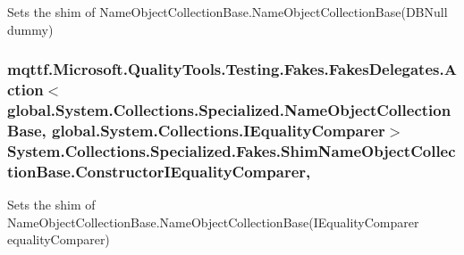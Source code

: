 Sets the shim of Name\-Object\-Collection\-Base.\-Name\-Object\-Collection\-Base(\-D\-B\-Null dummy)

\hypertarget{class_system_1_1_collections_1_1_specialized_1_1_fakes_1_1_shim_name_object_collection_base_ab8e0f3d7fdc3387f1640479a20383967}{
\subsubsection[{Constructor\-I\-Equality\-Comparer}]{\setlength{\rightskip}{0pt plus 5cm}mqttf.\-Microsoft.\-Quality\-Tools.\-Testing.\-Fakes.\-Fakes\-Delegates.\-Action$<$global.\-System.\-Collections.\-Specialized.\-Name\-Object\-Collection\-Base, global.\-System.\-Collections.\-I\-Equality\-Comparer$>$ System.\-Collections.\-Specialized.\-Fakes.\-Shim\-Name\-Object\-Collection\-Base.\-Constructor\-I\-Equality\-Comparer\hspace{0.3cm}{\ttfamily [static]}, {\ttfamily [set]}}}\label{class_system_1_1_collections_1_1_specialized_1_1_fakes_1_1_shim_name_object_collection_base_ab8e0f3d7fdc3387f1640479a20383967}


Sets the shim of Name\-Object\-Collection\-Base.\-Name\-Object\-Collection\-Base(\-I\-Equality\-Comparer equality\-Comparer)

